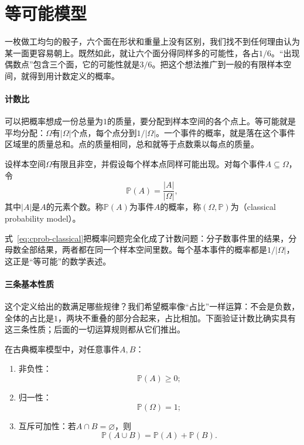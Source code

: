 \section{等可能模型}
\label{sec:cprob-equally-likely}

一枚做工均匀的骰子，六个面在形状和重量上没有区别，我们找不到任何理由认为某一面更容易朝上。既然如此，就让六个面分得同样多的可能性，各占$1/6$。“出现偶数点”包含三个面，它的可能性就是$3/6$。把这个想法推广到一般的有限样本空间，就得到用计数定义的概率。

\paragraph{计数比}
可以把概率想成一份总量为$1$的质量，要分配到样本空间的各个点上。等可能就是平均分配：$\Omega$有$\lvert\Omega\rvert$个点，每个点分到$1/\lvert\Omega\rvert$。一个事件的概率，就是落在这个事件区域里的质量总和。点的质量相同，总和就等于点数乘以每点的质量。

\begin{definition}[古典概率]
\label{def:cprob-classical}
设样本空间$\Omega$有限且非空，并假设每个样本点同样可能出现。对每个事件$A\subseteq\Omega$，令
\begin{equation}
 \mathbb{P}(A)=\frac{\lvert A\rvert}{\lvert\Omega\rvert},
 \label{eq:cprob-classical}
\end{equation}
其中$\lvert A\rvert$是$A$的元素个数。称$\mathbb{P}(A)$为事件$A$的概率，称$(\Omega,\mathbb{P})$为（classical probability model）。
\end{definition}

式~\eqref{eq:cprob-classical}把概率问题完全化成了计数问题：分子数事件里的结果，分母数全部结果，两者都在同一个样本空间里数。每个基本事件的概率都是$1/\lvert\Omega\rvert$，这正是“等可能”的数学表述。

\paragraph{三条基本性质}
这个定义给出的数满足哪些规律？我们希望概率像“占比”一样运算：不会是负数，全体的占比是$1$，两块不重叠的部分合起来，占比相加。下面验证计数比确实具有这三条性质；后面的一切运算规则都从它们推出。

\begin{theorem}[古典概率的基本性质]
\label{thm:cprob-axioms}
在古典概率模型中，对任意事件$A,B$：
\begin{enumerate}
 \item 非负性：
 \begin{equation}
  \mathbb{P}(A)\geq0;
  \label{eq:cprob-nonneg}
 \end{equation}
 \item 归一性：
 \begin{equation}
  \mathbb{P}(\Omega)=1;
  \label{eq:cprob-normalized}
 \end{equation}
 \item 互斥可加性：若$A\cap B=\varnothing$，则
 \begin{equation}
  \mathbb{P}(A\cup B)=\mathbb{P}(A)+\mathbb{P}(B).
  \label{eq:cprob-additive}
 \end{equation}
\end{enumerate}
\end{theorem}

